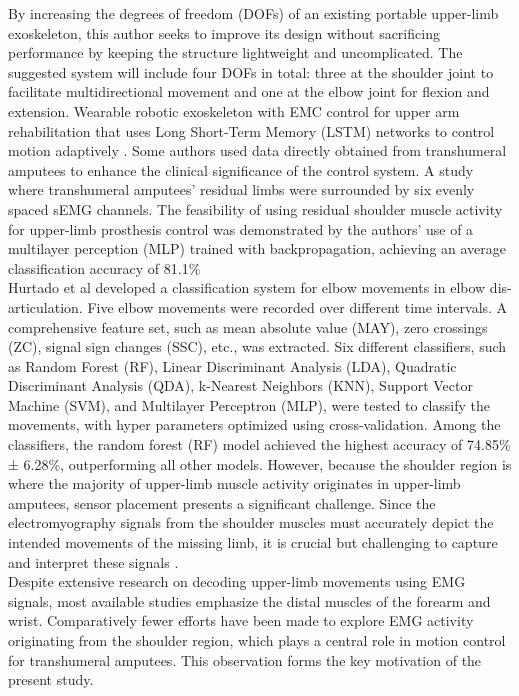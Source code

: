 \documentclass{elektr}
\begin{document}
\indent By increasing the degrees of freedom (DOFs) of an existing portable upper-limb exoskeleton, this author\cite{truong2024design} seeks to improve its design without sacrificing performance by keeping the structure lightweight and uncomplicated. The suggested system will include four DOFs in total: three at the shoulder joint to facilitate multidirectional movement and one at the elbow joint for flexion and extension. Wearable robotic exoskeleton with EMC control for upper arm rehabilitation that uses Long Short-Term Memory (LSTM) networks to control motion adaptively \cite{samarakoon2025long}. Some authors used data directly obtained from transhumeral amputees \cite {kimizuka2020shoulder} to enhance the clinical significance of the control system. A study \cite{gaudet2018classification} where transhumeral amputees' residual limbs were surrounded by six evenly spaced sEMG channels. The feasibility of using residual shoulder muscle activity for upper-limb prosthesis control was demonstrated by the authors' use of a multilayer perception (MLP) trained with backpropagation, achieving an average classification accuracy of 81.1\%\\
\indent Hurtado et al\cite{hurtado2024movements} developed a classification system for elbow movements in elbow dis-articulation. Five elbow movements were recorded over different time intervals. A comprehensive feature set, such as mean absolute value (MAY), zero crossings (ZC), signal sign changes (SSC), etc., was extracted. Six different classifiers, such as Random Forest (RF), Linear Discriminant Analysis (LDA), Quadratic Discriminant Analysis (QDA), k-Nearest Neighbors (KNN), Support Vector Machine (SVM), and Multilayer Perceptron (MLP), were tested to classify the movements, with hyper parameters optimized using cross-validation. Among the classifiers, the random forest (RF) model achieved the highest accuracy of 74.85\% ± 6.28\%, outperforming all other models. However, because the shoulder region is where the majority of upper-limb muscle activity originates in upper-limb amputees, sensor placement presents a significant challenge. Since the electromyography signals from the shoulder muscles must accurately depict the intended movements of the missing limb, it is crucial but challenging to capture and interpret these signals \cite{berjis2025selecting,reilly2020computational}.\\
\indent Despite extensive research on decoding upper-limb movements using EMG signals, most available studies emphasize the distal muscles of the forearm and wrist. Comparatively fewer efforts have been made to explore EMG activity originating from the shoulder region, which plays a central role in motion control for transhumeral amputees. This observation forms the key motivation       of the present study. \\
\end{document}
